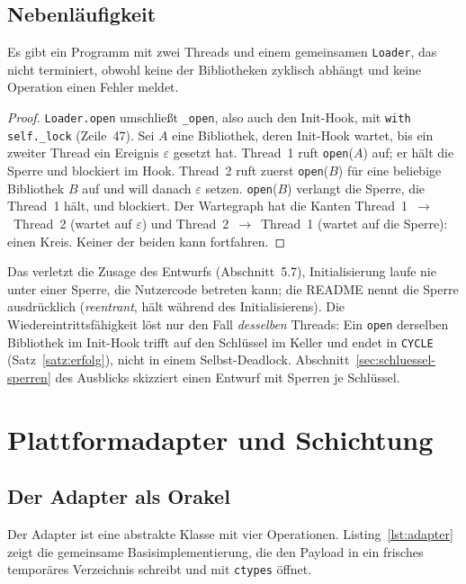 \section{Nebenläufigkeit}

\begin{satz}
	\label{satz:deadlock}
	Es gibt ein Programm mit zwei Threads und einem gemeinsamen \texttt{Loader}, das nicht terminiert, obwohl keine der Bibliotheken zyklisch abhängt und keine Operation einen Fehler meldet.
\end{satz}

\begin{proof}
	\texttt{Loader.open} umschließt \texttt{\_open}, also auch den Init-Hook, mit \texttt{with self.\_lock} (Zeile~47). Sei $A$ eine Bibliothek, deren Init-Hook wartet, bis ein zweiter Thread ein Ereignis $\varepsilon$ gesetzt hat. Thread~1 ruft \texttt{open}($A$) auf; er hält die Sperre und blockiert im Hook. Thread~2 ruft zuerst \texttt{open}($B$) für eine beliebige Bibliothek $B$ auf und will danach $\varepsilon$ setzen. \texttt{open}($B$) verlangt die Sperre, die Thread~1 hält, und blockiert. Der Wartegraph hat die Kanten Thread~1~$\to$~Thread~2 (wartet auf $\varepsilon$) und Thread~2~$\to$~Thread~1 (wartet auf die Sperre): einen Kreis. Keiner der beiden kann fortfahren.
\end{proof}

Das verletzt die Zusage des Entwurfs (Abschnitt~5.7), Initialisierung laufe nie unter einer Sperre, die Nutzercode betreten kann; die README nennt die Sperre ausdrücklich (\emph{reentrant}, hält während des Initialisierens). Die Wiedereintrittsfähigkeit löst nur den Fall \emph{desselben} Threads: Ein \texttt{open} derselben Bibliothek im Init-Hook trifft auf den Schlüssel im Keller und endet in \texttt{CYCLE} (Satz~\ref{satz:erfolg}), nicht in einem Selbst-Deadlock. Abschnitt~\ref{sec:schluessel-sperren} des Ausblicks skizziert einen Entwurf mit Sperren je Schlüssel.

\chapter{Plattformadapter und Schichtung}
\label{chap:adapter}

\section{Der Adapter als Orakel}

Der Adapter ist eine abstrakte Klasse mit vier Operationen. Listing~\ref{lst:adapter} zeigt die gemeinsame Basisimplementierung, die den Payload in ein frisches temporäres Verzeichnis schreibt und mit \texttt{ctypes} öffnet.

